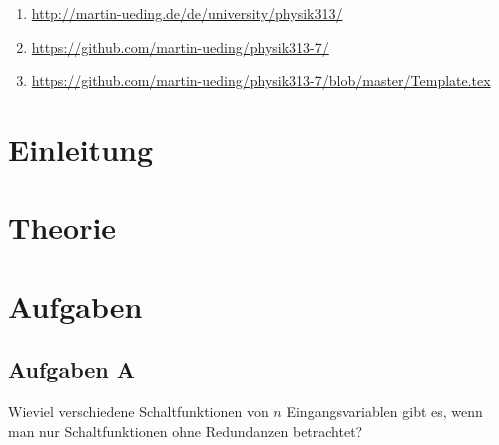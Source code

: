 \begin{enumerate}
	\item
		\label{it:mu}
		\url{http://martin-ueding.de/de/university/physik313/}
	\item
		\label{it:github/alles}
		\url{https://github.com/martin-ueding/physik313-7/}
	\item
		\label{it:github/template}
		\url{https://github.com/martin-ueding/physik313-7/blob/master/Template.tex}
\end{enumerate}

\newpage
\tableofcontents
\newpage


\FloatBarrier
\section{Einleitung}


\FloatBarrier
\section{Theorie}


\FloatBarrier
\section{Aufgaben}

\FloatBarrier
\subsection{Aufgaben A}

\begin{problem}
    Wieviel verschiedene Schaltfunktionen von $n$ Eingangsvariablen gibt es,
    wenn man nur Schaltfunktionen ohne Redundanzen betrachtet?
\end{problem}

